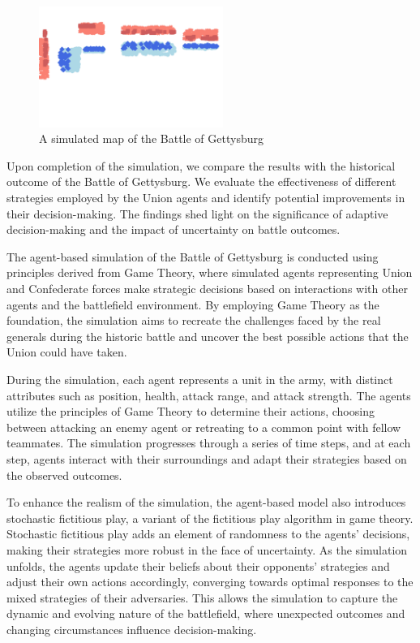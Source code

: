 \documentclass[final,5p,times,twocolumn,authoryear]{elsarticle}
\begin{document}
\begin{figure}[!ht]
  \centering
      \includegraphics[width=6cm]{sim_gett_map.png}
      \caption{A simulated map of the Battle of Gettysburg}
      \label{fig:Map}
  \centering
\end{figure}

Upon completion of the simulation, we compare the results with the historical outcome of the Battle of Gettysburg. We evaluate the effectiveness of different strategies employed by the Union agents and identify potential improvements in their decision-making. The findings shed light on the significance of adaptive decision-making and the impact of uncertainty on battle outcomes.


The agent-based simulation of the Battle of Gettysburg is conducted using principles derived from Game Theory, where simulated agents representing Union and Confederate forces make strategic decisions based on interactions with other agents and the battlefield environment. By employing Game Theory as the foundation, the simulation aims to recreate the challenges faced by the real generals during the historic battle and uncover the best possible actions that the Union could have taken.

During the simulation, each agent represents a unit in the army, with distinct attributes such as position, health, attack range, and attack strength. The agents utilize the principles of Game Theory to determine their actions, choosing between attacking an enemy agent or retreating to a common point with fellow teammates. The simulation progresses through a series of time steps, and at each step, agents interact with their surroundings and adapt their strategies based on the observed outcomes.

To enhance the realism of the simulation, the agent-based model also introduces stochastic fictitious play, a variant of the fictitious play algorithm in game theory. Stochastic fictitious play adds an element of randomness to the agents' decisions, making their strategies more robust in the face of uncertainty. As the simulation unfolds, the agents update their beliefs about their opponents' strategies and adjust their own actions accordingly, converging towards optimal responses to the mixed strategies of their adversaries. This allows the simulation to capture the dynamic and evolving nature of the battlefield, where unexpected outcomes and changing circumstances influence decision-making.
\end{document}
